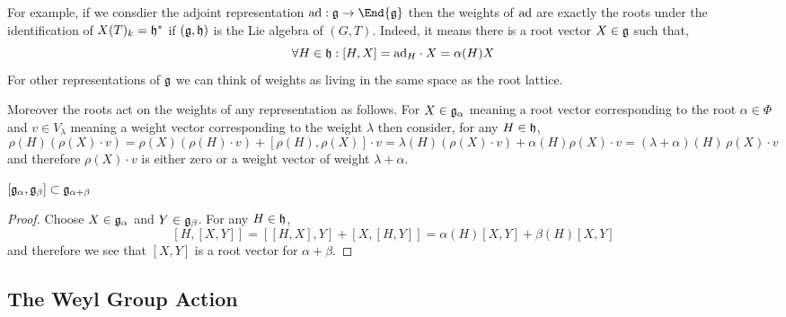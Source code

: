\documentclass[12pt]{article}
\begin{document}
For example, if we consdier the adjoint representation $\ad : \g \to \End{\g}$ then the weights of $\mathrm{ad}$ are exactly the roots under the identification of $X(T)_k = \mathfrak{h}^*$ if $(\mathfrak{g}, \mathfrak{h})$ is the Lie algebra of $(G, T)$. Indeed, it means there is a root vector $X \in \mathfrak{g}$ such that,
\[ \forall H \in \mathfrak{h} : [H, X] = \mathrm{ad}_{H} \cdot X = \alpha(H) X \]
For other representations of $\mathfrak{g}$ we can think of weights as living in the same space as the root lattice. 

\begin{rmk}
Moreover the roots act on the weights of any representation as follows. For $X \in \mathfrak{g}_\alpha$ meaning a root vector corresponding to the root $\alpha \in \Phi$ and $v \in V_\lambda$ meaning a weight vector corresponding to the weight $\lambda$ then consider, for any $H \in \mathfrak{h}$,
\[ \rho(H)(\rho(X) \cdot v) = \rho(X) (\rho(H) \cdot v) + [\rho(H), \rho(X)] \cdot v = \lambda(H) (\rho(X) \cdot v) + \alpha(H) \rho(X) \cdot v = (\lambda + \alpha)(H) \, \rho(X) \cdot v \]
and therefore $\rho(X) \cdot v$ is either zero or a weight vector of weight $\lambda + \alpha$.
\end{rmk}


\begin{lemma}
$[\mathfrak{g}_\alpha, \mathfrak{g}_\beta] \subset \mathfrak{g}_{\alpha + \beta}$
\end{lemma}

\begin{proof}
Choose $X \in \mathfrak{g}_\alpha$ and $Y \in \mathfrak{g}_{\beta}$. For any $H \in \mathfrak{h}$,
\[ [H, [X,Y]] = [[H,X],Y] + [X, [H,Y]] = \alpha(H) [X,Y] + \beta(H) [X, Y] \]
and therefore we see that $[X,Y]$ is a root vector for $\alpha + \beta$.
\end{proof}

\subsection{The Weyl Group Action}
\end{document}
